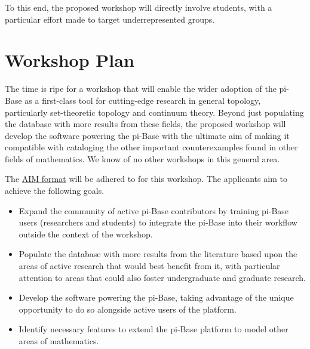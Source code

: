 \documentclass{amsart}
\newcommand{\TODO}[1]{\textcolor{red}{(TODO: #1)}}
\begin{document}
To this end, the proposed workshop will directly involve students,
with a particular effort made to target underrepresented groups.

\section{Workshop Plan}

The time is ripe for a workshop that will enable the wider adoption of the
pi-Base as a first-class tool for cutting-edge research in
general topology, particularly set-theoretic topology and continuum
theory. Beyond just populating the database with more results from
these fields, the proposed workshop will develop the software powering
the pi-Base with the ultimate aim of making it compatible with cataloging
the other important counterexamples found in other fields of mathematics.
We know of no other workshops in this general area.


The \href{https://www.aimath.org/research/aimstyle.html}{AIM format}
will be adhered to for this workshop. The applicants aim to achieve
the following goals.

\begin{itemize}
    \item Expand the community of active pi-Base contributors by training
    pi-Base users (researchers and students) to integrate the pi-Base
    into their workflow outside the context of the workshop.
    \item Populate the database with more results from the literature
    based upon the areas of active research that would best benefit
    from it, with particular attention to areas that could also foster
    undergraduate and graduate research.
    \item Develop the software powering the pi-Base, taking advantage
    of the unique opportunity to do so alongside active users of
    the platform.
    \item Identify necessary features to extend the pi-Base platform
    to model other areas of mathematics.
\end{itemize}


\end{document}
